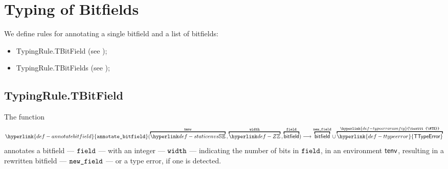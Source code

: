 \documentclass{book}
\newcommand\TTypeError[0]{\hyperlink{def-ttypeerror}{\textsf{TTypeError}}}
\newcommand\TypeErrorConfig[0]{\hyperlink{def-typeerrorconfig}{\texttt{\#TE}}}
\newcommand\annotatebitfield[0]{\hyperlink{def-annotatebitfield}{\texttt{annotate\_bitfield}}}
\begin{document}
\chapter{Typing of Bitfields}

We define rules for annotating a single bitfield and a list of bitfields:
\begin{itemize}
  \item TypingRule.TBitField (see );
  \item TypingRule.TBitFields (see );
\end{itemize}

\section{TypingRule.TBitField \label{sec:TypingRule.TBitField}}
\hypertarget{def-annotatebitfield}{}
The function
\[
  \annotatebitfield(\overname{\staticenvs}{\tenv} \aslsep \overname{\Z}{\width} \aslsep \overname{\bitfield}{\field})
  \aslto \overname{\bitfield}{\newfield} \cup \overname{\TTypeError}{\TypeErrorConfig}
\]
annotates a bitfield --- $\texttt{field}$ --- with an integer --- $\texttt{width}$ --- indicating the number of bits in $\texttt{field}$,
in an environment $\textsf{tenv}$, resulting in a
rewritten bitfield --- $\texttt{new\_field}$ --- or a type error, if one is detected.
\end{document}
